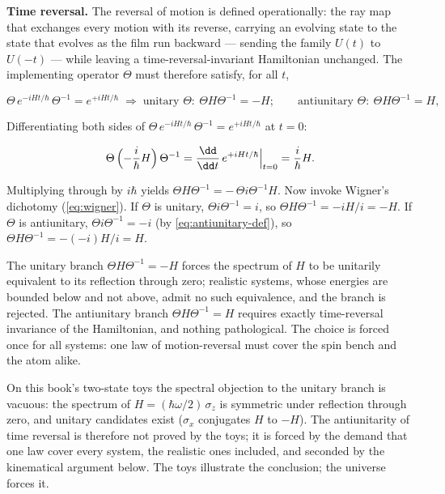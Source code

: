 \medskip\noindent\textbf{Time reversal.} The reversal of motion is defined operationally: the ray map that exchanges every motion with its reverse, carrying an evolving state to the state that evolves as the film run backward --- sending the family $U(t)$ to $U(-t)$ --- while leaving a time-reversal-invariant Hamiltonian unchanged. The implementing operator $\Theta$ must therefore satisfy, for all $t$,
\begin{linenomath}
    \begin{equation}
        \Theta\,e^{-iHt/\hbar}\,\Theta^{-1} = e^{+iHt/\hbar}
        \;\Longrightarrow\;
        \text{unitary } \Theta:\ \Theta H \Theta^{-1} = -H ;
        \qquad
        \text{antiunitary } \Theta:\ \Theta H \Theta^{-1} = H ,
        \label{eq:time-reversal-def}
    \end{equation}
\end{linenomath}
Differentiating both sides of $\Theta\,e^{-iHt/\hbar}\,\Theta^{-1} = e^{+iHt/\hbar}$ at $t=0$:
\begin{linenomath}
    \begin{equation*}
        \Theta\,\Bigl(-\frac{i}{\hbar}H\Bigr)\,\Theta^{-1}
        = \Bigl.\frac{\dd}{\dd t}\,e^{+iHt/\hbar}\Bigr|_{t=0}
        = \frac{i}{\hbar}H .
    \end{equation*}
\end{linenomath}
Multiplying through by $i\hbar$ yields $\Theta H \Theta^{-1} = -\,\Theta i \Theta^{-1} H$. Now invoke Wigner's dichotomy (\eqref{eq:wigner}). If $\Theta$ is unitary, $\Theta i \Theta^{-1} = i$, so $\Theta H \Theta^{-1} = -iH/i = -H$. If $\Theta$ is antiunitary, $\Theta i \Theta^{-1} = -i$ (by \eqref{eq:antiunitary-def}), so $\Theta H \Theta^{-1} = -(-i)H/i = H$.

The unitary branch $\Theta H \Theta^{-1} = -H$ forces the spectrum of $H$ to be unitarily equivalent to its reflection through zero; realistic systems, whose energies are bounded below and not above, admit no such equivalence, and the branch is rejected. The antiunitary branch $\Theta H \Theta^{-1} = H$ requires exactly time-reversal invariance of the Hamiltonian, and nothing pathological. The choice is forced once for all systems: one law of motion-reversal must cover the spin bench and the atom alike.

\begin{note}
    On this book's two-state toys the spectral objection to the unitary branch is vacuous: the spectrum of $H = (\hbar\omega/2)\,\sigma_z$ is symmetric under reflection through zero, and unitary candidates exist ($\sigma_x$ conjugates $H$ to $-H$). The antiunitarity of time reversal is therefore not proved by the toys; it is forced by the demand that one law cover every system, the realistic ones included, and seconded by the kinematical argument below. The toys illustrate the conclusion; the universe forces it.
\end{note}

